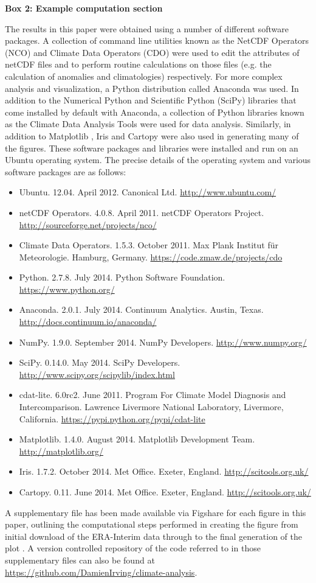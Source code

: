 \textbf{Box 2: Example computation section}

The results in this paper were obtained using a number of different software packages. A collection of command line utilities known as the NetCDF Operators (NCO) and Climate Data Operators (CDO) were used to edit the attributes of netCDF files and to perform routine calculations on those files (e.g. the calculation of anomalies and climatologies) respectively. For more complex analysis and visualization, a Python distribution called Anaconda was used. In addition to the Numerical Python \citep[NumPy;][]{VanDerWalt2011} and Scientific Python (SciPy) libraries that come installed by default with Anaconda, a collection of Python libraries known as the Climate Data Analysis Tools \citep[CDAT;][]{Doutriaux2009} were used for data analysis. Similarly, in addition to Matplotlib \citep[the default Python plotting library;][]{Hunter2007}, Iris and Cartopy were also used in generating many of the figures. These software packages and libraries were installed and run on an Ubuntu operating system. The precise details of the operating system and various software packages are as follows:
\begin{itemize}
\item Ubuntu. 12.04. April 2012. Canonical Ltd. \url{http://www.ubuntu.com/}
\item netCDF Operators. 4.0.8. April 2011. netCDF Operators Project. \url{http://sourceforge.net/projects/nco/}
\item Climate Data Operators. 1.5.3. October 2011. Max Plank Institut f{\"u}r Meteorologie. Hamburg, Germany. \url{https://code.zmaw.de/projects/cdo}
\item Python. 2.7.8. July 2014. Python Software Foundation. \url{https://www.python.org/}
\item Anaconda. 2.0.1. July 2014. Continuum Analytics. Austin, Texas. \url{http://docs.continuum.io/anaconda/}
\item NumPy. 1.9.0. September 2014. NumPy Developers. \url{http://www.numpy.org/}
\item SciPy. 0.14.0. May 2014. SciPy Developers. \url{http://www.scipy.org/scipylib/index.html}
\item cdat-lite. 6.0rc2. June 2011. Program For Climate Model Diagnosis and Intercomparison. Lawrence Livermore National Laboratory, Livermore, California. \url{https://pypi.python.org/pypi/cdat-lite}
\item Matplotlib. 1.4.0. August 2014. Matplotlib Development Team. \url{http://matplotlib.org/}
\item Iris. 1.7.2. October 2014. Met Office. Exeter, England. \url{http://scitools.org.uk/}
\item Cartopy. 0.11. June 2014. Met Office. Exeter, England. \url{http://scitools.org.uk/}
\end{itemize}

A supplementary file has been made available via Figshare for each figure in this paper, outlining the computational steps performed in creating the figure from initial download of the ERA-Interim data through to the final generation of the plot \citep{Irving2015}. A version controlled repository of the code referred to in those supplementary files can also be found at \url{https://github.com/DamienIrving/climate-analysis}.